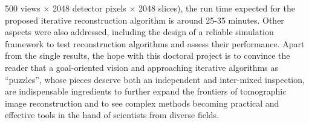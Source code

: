 {500 views $\times$ 2048 detector pixels $\times$ 2048 slices), the run time expected for the proposed iterative reconstruction algorithm
is around 25-35 minutes.
\newline\newline
Other aspects were also addressed, including the design of a reliable simulation framework
to test reconstruction algorithms and assess their performance.
\newline\newline
Apart from the single results, the hope with this doctoral project is to convince the reader that
a goal-oriented vision and approaching iterative algorithms as ``puzzles'', whose pieces deserve both an
independent and inter-mixed inspection, are indispensable ingredients to further expand the frontiers of
tomographic image reconstruction and to see complex methods becoming practical and effective tools in the hand of scientists
from diverse fields.
}
